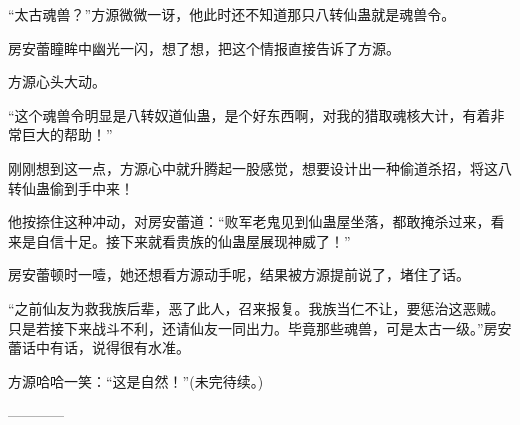 \begin{this_body}
“太古魂兽？”方源微微一讶，他此时还不知道那只八转仙蛊就是魂兽令。

房安蕾瞳眸中幽光一闪，想了想，把这个情报直接告诉了方源。

方源心头大动。

“这个魂兽令明显是八转奴道仙蛊，是个好东西啊，对我的猎取魂核大计，有着非常巨大的帮助！”

刚刚想到这一点，方源心中就升腾起一股感觉，想要设计出一种偷道杀招，将这八转仙蛊偷到手中来！

他按捺住这种冲动，对房安蕾道：“败军老鬼见到仙蛊屋坐落，都敢掩杀过来，看来是自信十足。接下来就看贵族的仙蛊屋展现神威了！”

房安蕾顿时一噎，她还想看方源动手呢，结果被方源提前说了，堵住了话。

“之前仙友为救我族后辈，恶了此人，召来报复。我族当仁不让，要惩治这恶贼。只是若接下来战斗不利，还请仙友一同出力。毕竟那些魂兽，可是太古一级。”房安蕾话中有话，说得很有水准。

方源哈哈一笑：“这是自然！”(未完待续。)

------------

\end{this_body}


